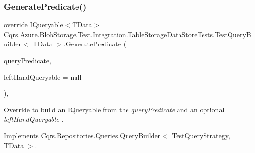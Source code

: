 \subsubsection{\texorpdfstring{Generate\+Predicate()}{GeneratePredicate()}}
{\footnotesize\ttfamily override I\+Queryable$<$T\+Data$>$ \hyperlink{classCqrs_1_1Azure_1_1BlobStorage_1_1Test_1_1Integration_1_1TableStorageDataStoreTests_1_1TestQueryBuilder}{Cqrs.\+Azure.\+Blob\+Storage.\+Test.\+Integration.\+Table\+Storage\+Data\+Store\+Tests.\+Test\+Query\+Builder}$<$ T\+Data $>$.Generate\+Predicate (\begin{DoxyParamCaption}\item[{\hyperlink{classCqrs_1_1Repositories_1_1Queries_1_1QueryPredicate}{Query\+Predicate}}]{query\+Predicate,  }\item[{I\+Queryable$<$ T\+Data $>$}]{left\+Hand\+Queryable = {\ttfamily null} }\end{DoxyParamCaption})\hspace{0.3cm}{\ttfamily [protected]}, {\ttfamily [virtual]}}



Override to build an I\+Queryable from the {\itshape query\+Predicate}  and an optional {\itshape left\+Hand\+Queryable} . 



Implements \hyperlink{classCqrs_1_1Repositories_1_1Queries_1_1QueryBuilder_aa38989a8b4808c7c73e7cf038b535ea7_aa38989a8b4808c7c73e7cf038b535ea7}{Cqrs.\+Repositories.\+Queries.\+Query\+Builder$<$ Test\+Query\+Strategy, T\+Data $>$}.


